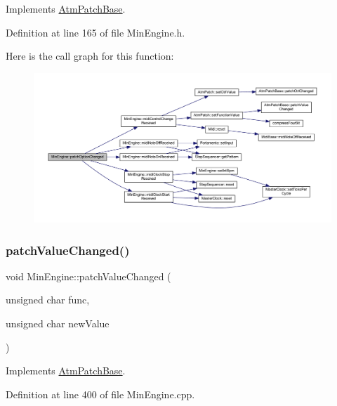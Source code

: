 Implements \hyperlink{class_atm_patch_base_ad31f8d45a0a630ee3052d69ee125e2f3}{Atm\+Patch\+Base}.



Definition at line 165 of file Min\+Engine.\+h.

Here is the call graph for this function\+:
\nopagebreak
\begin{figure}[H]
\begin{center}
\leavevmode
\includegraphics[width=350pt]{class_min_engine_aff5a85aae7d6f6e5edd571c73c071871_cgraph}
\end{center}
\end{figure}
\mbox{\label{class_min_engine_a229d4b913277a48909bf1aa01176ae1f}} 
\subsubsection{\texorpdfstring{patch\+Value\+Changed()}{patchValueChanged()}}
{\footnotesize\ttfamily void Min\+Engine\+::patch\+Value\+Changed (\begin{DoxyParamCaption}\item[{unsigned char}]{func,  }\item[{unsigned char}]{new\+Value }\end{DoxyParamCaption})\hspace{0.3cm}{\ttfamily [virtual]}}



Implements \hyperlink{class_atm_patch_base_ad561145330e0b53990f222c243ef5e89}{Atm\+Patch\+Base}.



Definition at line 400 of file Min\+Engine.\+cpp.

